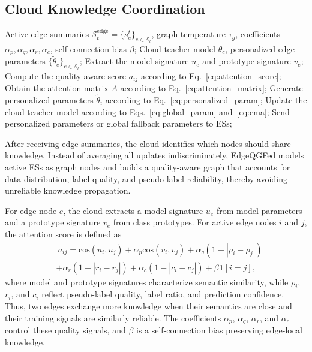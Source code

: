 ﻿\documentclass[10pt, conference, letterpaper]{ IEEEtran}
\begin{document}
\subsection{Cloud Knowledge Coordination }
\label{subsec:graph_aggregation}
\begin{algorithm}[t]
\caption{Cloud-Side Quality-Aware Graph Attention Aggregation}
\label{alg:graph_aggregation}
\begin{algorithmic}[1]
\REQUIRE Active edge summaries $\mathcal{S}^{\mathrm{edge}}_t=\{s_e^t\}_{e\in\mathcal{E}_t}$, graph temperature $\tau_g$, coefficients $\alpha_p,\alpha_q,\alpha_r,\alpha_c$, self-connection bias $\beta$;
\ENSURE Cloud teacher model $\theta_c$, personalized edge parameters $\{\tilde{\theta}_e\}_{e\in\mathcal{E}_t}$;
    \STATE Extract the model signature $u_e$ and prototype signature $v_e$;
\ENDFOR
{}
    \STATE Compute the quality-aware score $a_{ij}$ according to Eq.~\eqref{eq:attention_score};
\ENDFOR
\STATE Obtain the attention matrix $A$ according to Eq.~\eqref{eq:attention_matrix};
    \STATE Generate personalized parameters $\tilde{\theta}_i$ according to Eq.~\eqref{eq:personalized_param};
\ENDFOR
\STATE Update the cloud teacher model according to Eqs.~\eqref{eq:global_param} and~\eqref{eq:ema};
\STATE Send personalized parameters or global fallback parameters to ESs;
\end{algorithmic}
\end{algorithm}

After receiving edge summaries, the cloud identifies which nodes should share knowledge. Instead of averaging all updates indiscriminately, EdgeQGFed models active ESs as graph nodes and builds a quality-aware graph that accounts for data distribution, label quality, and pseudo-label reliability, thereby avoiding unreliable knowledge propagation.

For edge node $e$, the cloud extracts a model signature $u_e$ from model parameters and a prototype signature $v_e$ from class prototypes. For active edge nodes $i$ and $j$, the attention score is defined as
\begin{align}
    &\ a_{ij} =
     \mathrm{cos}(u_i,u_j)
    + \alpha_p \mathrm{cos}(v_i,v_j)
    + \alpha_q (1-|\rho_i-\rho_j|) \nonumber \\
    &+ \alpha_r (1-|r_i-r_j|)
    + \alpha_c (1-|c_i-c_j|)
    + \beta \mathbf{1}[i=j],
    \label{eq:attention_score}
\end{align}
where model and prototype signatures characterize semantic similarity, while $\rho_i$, $r_i$, and $c_i$ reflect pseudo-label quality, label ratio, and prediction confidence. Thus, two edges exchange more knowledge when their semantics are close and their training signals are similarly reliable. The coefficients $\alpha_p$, $\alpha_q$, $\alpha_r$, and $\alpha_c$ control these quality signals, and $\beta$ is a self-connection bias preserving edge-local knowledge.
\end{document}
